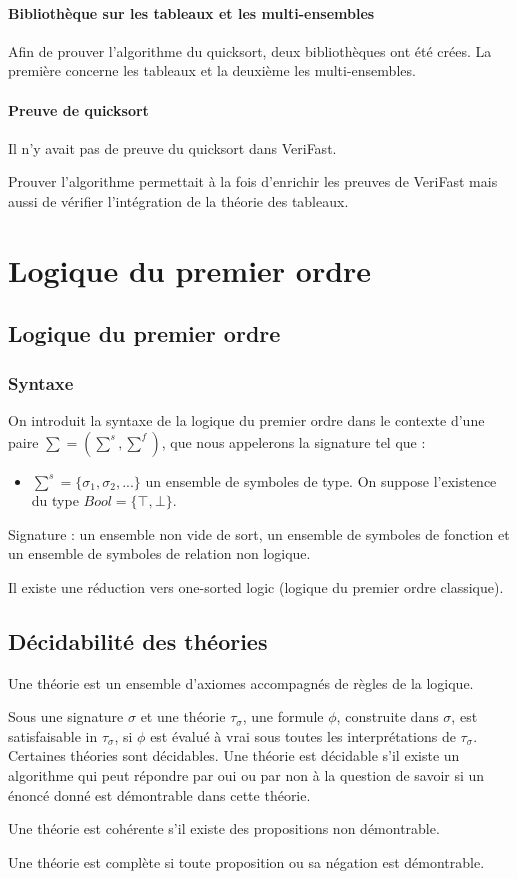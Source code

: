 \documentclass[9pt]{book}
\newcommand{\verifast}{VeriFast}
\begin{document}
			\subsubsection{Biblioth\`eque sur les tableaux et les multi-ensembles}
			Afin de prouver l'algorithme du quicksort, deux biblioth\`eques ont \'et\'e cr\'ees. La premi\`ere concerne les tableaux et la deuxi\`eme les multi-ensembles.

			\subsubsection{Preuve de quicksort}
			Il n'y avait pas de preuve du quicksort dans \verifast{}. \par Prouver l'algorithme permettait \`a la fois d'enrichir les preuves de \verifast{} mais aussi de v\'erifier l'int\'egration de la th\'eorie des tableaux.


\chapter{Logique du premier ordre}
	\section{Logique du premier ordre}
		\subsection{Syntaxe}
		On introduit la syntaxe de la logique du premier ordre dans le contexte d'une paire $\sum = (\sum^s,\sum^f)$, que nous appelerons la signature tel que :
		\begin{itemize}
		\item $\sum^s = \{ \sigma_{1}, \sigma_{2},...\}$ un ensemble de symboles de type. On suppose l'existence du type $Bool = \{ \top , \bot \}$.
		\end{itemize}

	    Signature : un ensemble non vide de sort, un ensemble de symboles de fonction et un ensemble de symboles de relation non logique.\par
		Il existe une r\'eduction vers one-sorted logic (logique du premier ordre classique).
 	\section{D\'ecidabilit\'e des th\'eories}
 		Une th\'eorie est un ensemble d'axiomes accompagn\'es de r\`egles de la logique. \par
		Sous une signature $\sigma$ et une th\'eorie $\tau_{\sigma}$, une formule $\phi$, construite dans $\sigma$, est satisfaisable in $\tau_{\sigma}$, si $\phi$ est \'evalu\'e \`a vrai sous toutes les interpr\'etations de $\tau_{\sigma}$.
 		Certaines th\'eories sont d\'ecidables. Une th\'eorie est d\'ecidable s'il existe un algorithme qui peut r\'epondre par oui ou par non \`a la question de savoir si un \'enonc\'e donn\'e est d\'emontrable dans cette th\'eorie. \par
 		Une th\'eorie est coh\'erente s'il existe des propositions non d\'emontrable. \par
 		Une th\'eorie est compl\`ete si toute proposition ou sa
 		n\'egation est d\'emontrable.
\end{document}
